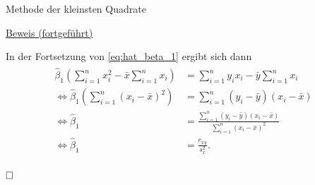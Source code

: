 \documentclass[
  8pt,
  ignorenonframetext,
]{beamer}
\begin{document}
\begin{frame}{Methode der kleinsten Quadrate}
\protect\hypertarget{methode-der-kleinsten-quadrate-13}{}
\tiny
\vspace{2mm}
\setlength{\abovedisplayskip}{3pt}
\setlength{\belowdisplayskip}{3pt}

\underline{Beweis (fortgeführt)}

In der Fortsetzung von \eqref{eq:hat_beta_1} ergibt sich dann
\begin{align} 
\begin{split}
\hat{\beta}_1 \left(\sum_{i=1}^n x_i^2  - \bar{x}\sum_{i=1}^n x_i\right)         
& = \sum_{i=1}^n y_ix_i - \bar{y}\sum_{i=1}^n x_i  
\\
\Leftrightarrow
\hat{\beta}_1 \left(\sum_{i=1}^n \left(x_i - \bar{x}\right)^2\right)         
& =  \sum_{i=1}^n \left(y_i-\bar{y}\right)\left(x_i-\bar{x}\right) 
\\
\Leftrightarrow
\hat{\beta}_1        
& = \frac{\sum_{i=1}^n \left(y_i-\bar{y}\right)\left(x_i-\bar{x}\right)}{\sum_{i=1}^n \left(x_i - \bar{x}\right)^2} 
\\
\Leftrightarrow
\hat{\beta}_1        
& = \frac{c_{xy}}{s_x^2}. 
\end{split}
\end{align}

\(\hfill\Box\)
\end{frame}
\end{document}

